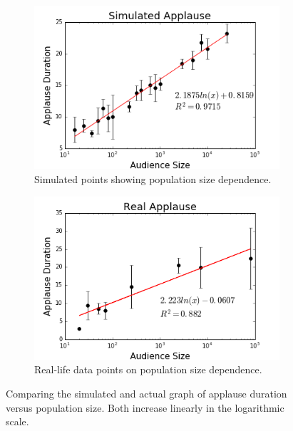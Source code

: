 \begin{figure}[h]
  \centering
  \begin{subfigure}[b]{\linewidth}
    \includegraphics[width=\linewidth]{images/chapter4/sim.png}
    \caption{Simulated points showing population size dependence.}
  \end{subfigure}
  \begin{subfigure}[b]{\linewidth}
    \includegraphics[width=\linewidth]{images/chapter4/real.png}
    \caption{Real-life data points on population size dependence.}
  \end{subfigure}
  \caption{Comparing the simulated and actual graph of applause duration versus population size. Both increase linearly in the logarithmic scale.}
  \label{fig:durXsizComp}
\end{figure}

